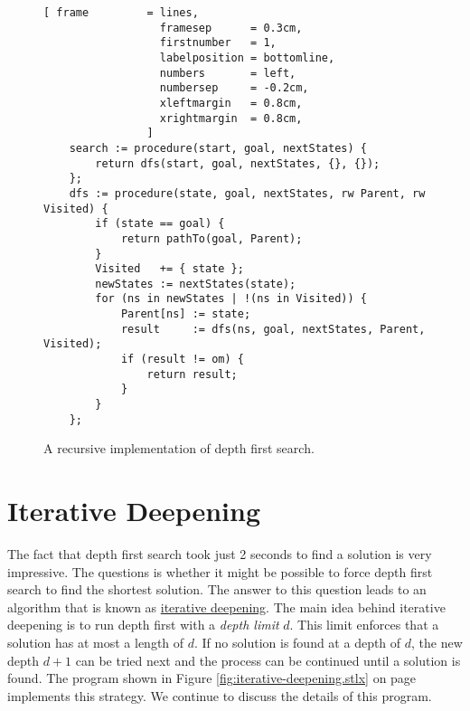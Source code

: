 \begin{figure}[!ht]
\centering
\begin{Verbatim}[ frame         = lines, 
                  framesep      = 0.3cm, 
                  firstnumber   = 1,
                  labelposition = bottomline,
                  numbers       = left,
                  numbersep     = -0.2cm,
                  xleftmargin   = 0.8cm,
                  xrightmargin  = 0.8cm,
                ]
    search := procedure(start, goal, nextStates) {
        return dfs(start, goal, nextStates, {}, {});
    };
    dfs := procedure(state, goal, nextStates, rw Parent, rw Visited) {
        if (state == goal) {
            return pathTo(goal, Parent);
        }
        Visited   += { state };
        newStates := nextStates(state);
        for (ns in newStates | !(ns in Visited)) {
            Parent[ns] := state;
            result     := dfs(ns, goal, nextStates, Parent, Visited);
            if (result != om) {
                return result;
            }   
        }
    };
\end{Verbatim}
\vspace*{-0.3cm}
\caption{A recursive implementation of depth first search.}
\label{fig:depth-first-search-recursive.stlx}
\end{figure}

\section{Iterative Deepening}
The fact that depth first search took just 2 seconds to find a solution is very impressive.  The questions is
whether it might be possible to force depth first search to find the shortest solution.  The answer to this
question leads to an algorithm that is known as
\href{https://en.wikipedia.org/wiki/Iterative_deepening_depth-first_search}{iterative deepening}.  The main
idea behind iterative deepening is to run depth first with a \emph{\color{blue}depth limit} $d$.  This limit
enforces that a solution has at most a length of $d$.  If no solution is found at a depth of $d$, the new depth
$d+1$ can be tried next and the process can be continued until a solution is found.  The program shown in
Figure \ref{fig:iterative-deepening.stlx} on page \pageref{fig:iterative-deepening.stlx} implements this strategy.
We continue to discuss the details of this program.

